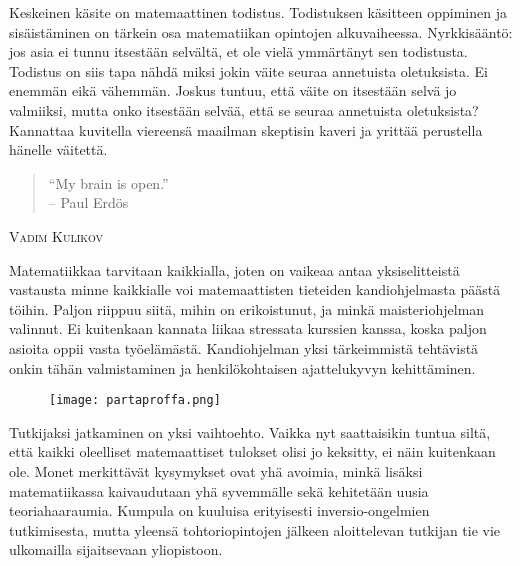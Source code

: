\documentclass[../ala_hataile.tex]{subfiles}
\begin{document}
	Keskeinen käsite on matemaattinen todistus.
	Todistuksen käsitteen oppiminen ja
	sisäistäminen on tärkein osa matematiikan
	opintojen alkuvaiheessa. Nyrkkisääntö: jos
	asia ei tunnu itsestään selvältä, et ole vielä
	ymmärtänyt sen todistusta. Todistus on siis
	tapa nähdä miksi jokin väite seuraa annetuista
	oletuksista. Ei enemmän eikä vähemmän.
	Joskus tuntuu, että väite on itsestään
	selvä jo valmiiksi, mutta onko itsestään selvää,
	että se seuraa annetuista oletuksista?
	Kannattaa kuvitella viereensä maailman
	skeptisin kaveri ja yrittää perustella hänelle
	väitettä.
	
	\begin{quote}
		``My brain is open.''\\-- Paul Erdös
	\end{quote}
	
	\vspace{0.5cm}
	\noindent\textsc{Vadim Kulikov}
	
	Matematiikkaa tarvitaan kaikkialla, joten on vaikeaa antaa yksi\-selitteistä vastausta minne kaikkialle voi matemaattisten tieteiden kandi\-ohjelmasta päästä töihin. Paljon riippuu siitä, mihin on erikoistunut, ja minkä maisteri\-ohjelman valinnut. Ei kuitenkaan kannata liikaa stressata kurssien kanssa, koska paljon asioita oppii vasta työelämästä. Kandiohjelman yksi tärkeimmistä tehtävistä onkin tähän valmistaminen ja henkilö\-kohtaisen ajattelukyvyn kehittäminen. 
	\begin{figure}[h!]
		\centering
		\texttt{[image: partaproffa.png]}
	\end{figure}

	Tutkijaksi jatkaminen on yksi vaihtoehto. Vaikka nyt saattaisikin tuntua siltä, että kaikki oleelliset matemaattiset tulokset olisi jo keksitty, ei näin kuitenkaan ole. Monet merkittävät kysymykset ovat yhä avoimia, minkä lisäksi matematiikassa kaivaudutaan yhä syvemmälle sekä kehitetään uusia teoriahaaraumia. Kumpula on kuuluisa erityisesti inversio-ongelmien tutkimisesta, mutta yleensä tohtoriopintojen jälkeen aloittelevan tutkijan tie vie ulkomailla sijaitsevaan yliopistoon. 
	
\end{document}
